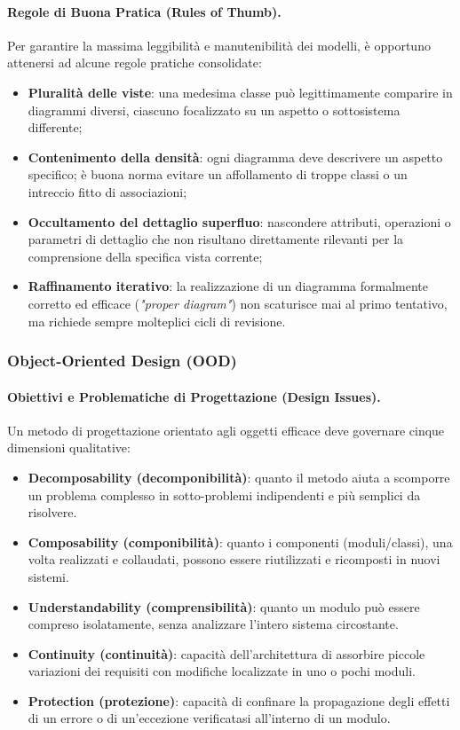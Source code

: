 \documentclass[12pt]{extarticle}
\begin{document}
\paragraph{Regole di Buona Pratica (Rules of Thumb).}
Per garantire la massima leggibilit\`a e manutenibilit\`a dei modelli, \`e opportuno attenersi ad alcune regole pratiche consolidate:
\begin{itemize}
    \item \textbf{Pluralit\`a delle viste}: una medesima classe pu\`o legittimamente comparire in diagrammi diversi, ciascuno focalizzato su un aspetto o sottosistema differente;
    \item \textbf{Contenimento della densit\`a}: ogni diagramma deve descrivere un aspetto specifico; \`e buona norma evitare un affollamento di troppe classi o un intreccio fitto di associazioni;
    \item \textbf{Occultamento del dettaglio superfluo}: nascondere attributi, operazioni o parametri di dettaglio che non risultano direttamente rilevanti per la comprensione della specifica vista corrente;
    \item \textbf{Raffinamento iterativo}: la realizzazione di un diagramma formalmente corretto ed efficace (\textit{"proper diagram"}) non scaturisce mai al primo tentativo, ma richiede sempre molteplici cicli di revisione.
\end{itemize}

\subsubsection{Object-Oriented Design (OOD)}

\paragraph{Obiettivi e Problematiche di Progettazione (Design Issues).}
Un metodo di progettazione orientato agli oggetti efficace deve governare cinque dimensioni qualitative:
\begin{itemize}
    \item \textbf{Decomposability (decomponibilità)}: quanto il metodo aiuta a scomporre un problema complesso in sotto-problemi indipendenti e più semplici da risolvere.
    \item \textbf{Composability (componibilità)}: quanto i componenti (moduli/classi), una volta realizzati e collaudati, possono essere riutilizzati e ricomposti in nuovi sistemi.
    \item \textbf{Understandability (comprensibilità)}: quanto un modulo può essere compreso isolatamente, senza analizzare l'intero sistema circostante.
    \item \textbf{Continuity (continuità)}: capacità dell'architettura di assorbire piccole variazioni dei requisiti con modifiche localizzate in uno o pochi moduli.
    \item \textbf{Protection (protezione)}: capacità di confinare la propagazione degli effetti di un errore o di un'eccezione verificatasi all'interno di un modulo.
\end{itemize}
\end{document}

